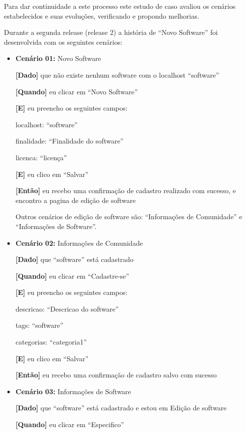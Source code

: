 Para dar continuidade a este processo este estudo de caso avaliou os cenários estabelecidos e suas evoluções, verificando e propondo melhorias.

Durante a segunda release (release 2) a história de ``Novo Software'' foi desenvolvida com os seguintes cenários:

\begin{itemize}
\item\textbf{Cenário 01:} Novo Software

	\textbf{[Dado]} que não existe nenhum software com o localhost ``software''

	\textbf{[Quando]} eu clicar em ``Novo Software''

	\textbf{[E]} eu preencho os seguintes campos: 

  		\subitem localhost: ``software''

  		\subitem finalidade: ``Finalidade do software''

  		\subitem licenca: ``licença''
  		
  		
	\textbf{[E]} eu clico em ``Salvar''

	\textbf{[Então]} eu recebo uma confirmação de cadastro realizado com sucesso, e encontro a pagina de edição de software


Outros cenários de edição de software são: ``Informações de Comunidade'' e ``Informações de Software''.

\item\textbf{Cenário 02:} Informações de Comunidade

	\textbf{[Dado]} que ``software'' está cadastrado

	\textbf{[Quando]} eu clicar em ``Cadastre-se''

	\textbf{[E]} eu preencho os seguintes campos: 

  		\subitem descricao: ``Descricao do software''

  		\subitem tags: ``software''

  		\subitem categorias: ``categoria1''
 
	\textbf{[E]} eu clico em ``Salvar''

	\textbf{[Então]} eu recebo uma confirmação de cadastro salvo com sucesso


\item\textbf{Cenário 03:} Informações de Software

	\textbf{[Dado]} que ``software'' está cadastrado e estou em Edição de software

	\textbf{[Quando]} eu clicar em ``Especifico''


\end{itemize}
